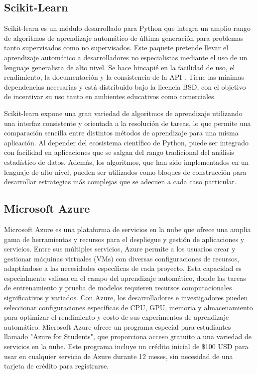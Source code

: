 

\subsection{Scikit-Learn}

Scikit-learn \cite{scikit-learn} es un módulo desarrollado para Python que integra un amplio rango de algoritmos de aprendizaje automático de última generación para problemas tanto supervisados como no supervisados. Este paquete pretende llevar el aprendizaje automático a desarrolladores no especialistas mediante el uso de un lenguaje generalista de alto nivel. Se hace hincapié en la facilidad de uso, el rendimiento, la documentación y la consistencia de la API \cite{scikit-learn-api}. Tiene las mínimas dependencias necesarias y está distribuido bajo la licencia BSD, con el objetivo de incentivar su uso tanto en ambientes educativos como comerciales.

Scikit-learn expone una gran variedad de algoritmos de aprendizaje utilizando una interfaz consistente y orientada a la resolución de tareas, lo que permite una comparación sencilla entre distintos métodos de aprendizaje para una misma aplicación. Al depender del ecosistema científico de Python, puede ser integrado con facilidad en aplicaciones que se salgan del rango tradicional del análisis estadístico de datos. Además, los algoritmos, que han sido implementados en un lenguaje de alto nivel, pueden ser utilizados como bloques de construcción para desarrollar estrategias más complejas que se adecuen a cada caso particular.

\subsection{Microsoft Azure}
\label{subsec:azure}

Microsoft Azure es una plataforma de servicios en la nube que ofrece una amplia gama de herramientas y recursos para el despliegue y gestión de aplicaciones y servicios. Entre sus múltiples servicios, Azure permite a los usuarios crear y gestionar máquinas virtuales (VMs) con diversas configuraciones de recursos, adaptándose a las necesidades específicas de cada proyecto. Esta capacidad es especialmente valiosa en el campo del aprendizaje automático, donde las tareas de entrenamiento y prueba de modelos requieren recursos computacionales significativos y variados. Con Azure, los desarrolladores e investigadores pueden seleccionar configuraciones específicas de CPU, GPU, memoria y almacenamiento para optimizar el rendimiento y costo de sus experimentos de aprendizaje automático. Microsoft Azure ofrece un programa especial para estudiantes llamado "Azure for Students", que proporciona acceso gratuito a una variedad de servicios en la nube. Este programa incluye un crédito inicial de \$100 USD para usar en cualquier servicio de Azure durante 12 meses, sin necesidad de una tarjeta de crédito para registrarse. 

